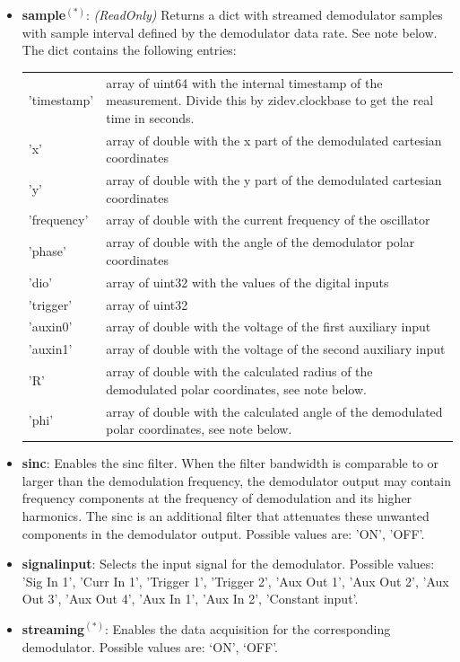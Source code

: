 \documentclass[11pt]{article} %
\begin{document}
\begin{itemize}
	\item {\bf sample}$^{(*)}$: {\it (ReadOnly)} Returns a dict with streamed demodulator samples with sample interval defined by the demodulator data rate. See note below. The dict contains the following entries:
	\setlength{\LTleft}{0.9cm}
	\begin{longtable}{p{3.1cm}p{12.7cm}}
	'timestamp' & array of uint64 with the internal timestamp of the measurement. Divide this by zidev.clockbase to get the real time in seconds. \\
	'x' & array of double with the x part of the demodulated cartesian coordinates \\
	'y' & array of double with the y part of the demodulated cartesian coordinates \\
	'frequency' & array of double with the current frequency of the oscillator \\
	'phase' & array of double with the angle of the demodulator polar coordinates \\
	'dio' & array of uint32 with the values of the digital inputs \\
	'trigger' & array of uint32 \\
	'auxin0' & array of double with the voltage of the first auxiliary input \\
	'auxin1' & array of double with the voltage of the second auxiliary input \\
	'R' & array of double with the calculated radius of the demodulated polar coordinates, see note below. \\
	'phi' & array of double with the calculated angle of the demodulated polar coordinates, see note below. \\
	\end{longtable}
	\item {\bf sinc}: Enables the sinc filter. When the filter bandwidth is comparable to or larger than the demodulation frequency, the demodulator output may contain frequency components at the frequency of demodulation and its higher harmonics. The sinc is an additional filter that attenuates these unwanted components in the demodulator output. Possible values are: 'ON', 'OFF'.
	\item {\bf signalinput}: Selects the input signal for the demodulator. Possible values: 'Sig In 1', 'Curr In 1', 'Trigger 1', 'Trigger 2', 'Aux Out 1', 'Aux Out 2', 'Aux Out 3', 'Aux Out 4', 'Aux In 1', 'Aux In 2', 'Constant input'.
	\item {\bf streaming}$^{(*)}$: Enables the data acquisition for the corresponding demodulator. Possible values are: `ON', `OFF'.

\end{itemize}
\end{document}
